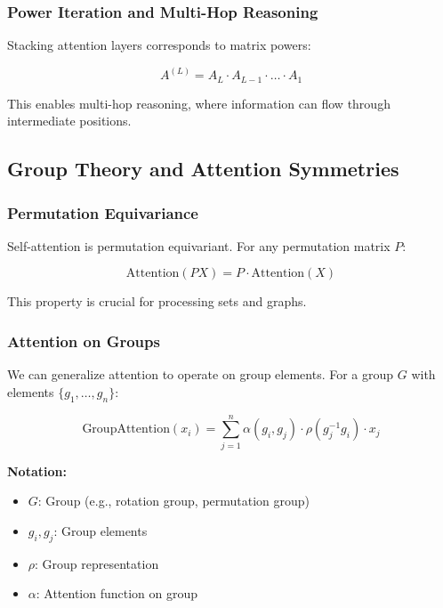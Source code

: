 \subsubsection{Power Iteration and Multi-Hop Reasoning}

Stacking attention layers corresponds to matrix powers:

\begin{equation}
A^{(L)} = A_L \cdot A_{L-1} \cdot \ldots \cdot A_1
\end{equation}

This enables multi-hop reasoning, where information can flow through intermediate positions.

\subsection{Group Theory and Attention Symmetries}

\subsubsection{Permutation Equivariance}

Self-attention is permutation equivariant. For any permutation matrix $P$:

\begin{equation}
\text{Attention}(PX) = P \cdot \text{Attention}(X)
\end{equation}

This property is crucial for processing sets and graphs.

\subsubsection{Attention on Groups}

We can generalize attention to operate on group elements. For a group $G$ with elements $\{g_1, \ldots, g_n\}$:

\begin{equation}
\text{GroupAttention}(x_i) = \sum_{j=1}^{n} \alpha(g_i, g_j) \cdot \rho(g_j^{-1} g_i) \cdot x_j
\end{equation}

\begin{notationbox}
\textbf{Notation:}
\begin{itemize}
    \item $G$: Group (e.g., rotation group, permutation group)
    \item $g_i, g_j$: Group elements
    \item $\rho$: Group representation
    \item $\alpha$: Attention function on group
\end{itemize}
\end{notationbox}

